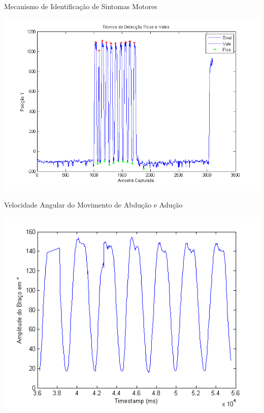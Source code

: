 \documentclass{beamer}
\begin{document}
\begin{frame}{Mecanismo de Identificação de Sintomas Motores}
     \begin{block}{}
      \center 
      \includegraphics[height=2.2 in]{img/deteccaopicosvales.png}
     \end{block}
\end{frame}


\begin{frame}{Velocidade Angular do Movimento de Abdução e Adução}
     \begin{block}{}
      \center 
      \includegraphics[height=2.2 in]{img/amplitude-braco.png}
     \end{block}
\end{frame}
\end{document}
